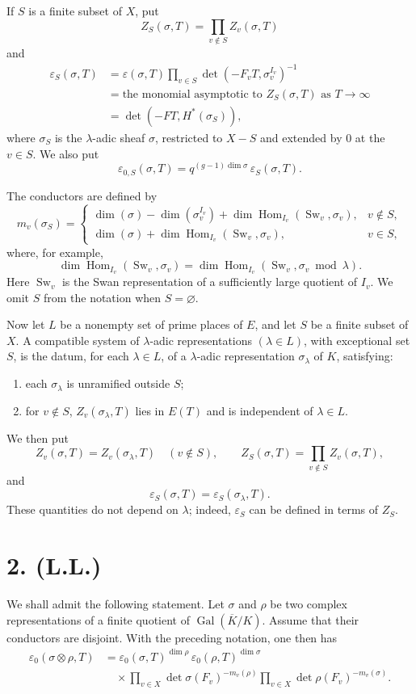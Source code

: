 \documentclass[11pt]{article}
\newcommand{\Gal}{\operatorname{Gal}}
\newcommand{\Hom}{\operatorname{Hom}}
\newcommand{\Sw}{\operatorname{Sw}}
\newcommand{\eps}{\varepsilon}
\begin{document}
If \(S\) is a finite subset of \(X\), put
\[
Z_S(\sigma,T)=\prod_{v\notin S} Z_v(\sigma,T)
\]
and
\[
\begin{aligned}
\eps_S(\sigma,T)
&=\eps(\sigma,T)\prod_{v\in S}
\det(-F_vT,\sigma_v^{I_v})^{-1}  \\
&=\text{the monomial asymptotic to }Z_S(\sigma,T)\text{ as }T\to\infty \\
&=\det(-FT,H^\ast(\sigma_S)),
\end{aligned}
\]
where \(\sigma_S\) is the \(\lambda\)-adic sheaf \(\sigma\), restricted to \(X-S\) and extended by \(0\) at the \(v\in S\). We also put
\[
\eps_{0,S}(\sigma,T)=q^{(g-1)\dim\sigma}\,\eps_S(\sigma,T).
\]

The conductors are defined by
\[
m_v(\sigma_S)=
\begin{cases}
\dim(\sigma)-\dim(\sigma_v^{I_v})
+\dim\Hom_{I_v}(\Sw_v,\sigma_v), & v\notin S,\\[4pt]
\dim(\sigma)+\dim\Hom_{I_v}(\Sw_v,\sigma_v), & v\in S,
\end{cases}
\]
where, for example,
\[
\dim\Hom_{I_v}(\Sw_v,\sigma_v)
=
\dim\Hom_{I_v}(\Sw_v,\sigma_v \bmod \lambda).
\]
Here \(\Sw_v\) is the Swan representation of a sufficiently large quotient of \(I_v\). We omit \(S\) from the notation when \(S=\varnothing\).

Now let \(L\) be a nonempty set of prime places of \(E\), and let \(S\) be a finite subset of \(X\). A compatible system of \(\lambda\)-adic representations \((\lambda\in L)\), with exceptional set \(S\), is the datum, for each \(\lambda\in L\), of a \(\lambda\)-adic representation \(\sigma_\lambda\) of \(K\), satisfying:
\begin{enumerate}[label=(\roman*)]
\item each \(\sigma_\lambda\) is unramified outside \(S\);
\item for \(v\notin S\), \(Z_v(\sigma_\lambda,T)\) lies in \(E(T)\) and is independent of \(\lambda\in L\).
\end{enumerate}
We then put
\[
Z_v(\sigma,T)=Z_v(\sigma_\lambda,T)\quad(v\notin S),\qquad
Z_S(\sigma,T)=\prod_{v\notin S}Z_v(\sigma,T),
\]
and
\[
\eps_S(\sigma,T)=\eps_S(\sigma_\lambda,T).
\]
These quantities do not depend on \(\lambda\); indeed, \(\eps_S\) can be defined in terms of \(Z_S\).

\section*{2. (L.L.)}

We shall admit the following statement. Let \(\sigma\) and \(\rho\) be two complex representations of a finite quotient of \(\Gal(\overline K/K)\). Assume that their conductors are disjoint. With the preceding notation, one then has
\[
\tag{L.L.}
\begin{aligned}
\eps_0(\sigma\otimes\rho,T)
&=\eps_0(\sigma,T)^{\dim\rho}\,
  \eps_0(\rho,T)^{\dim\sigma}  \\
&\quad\times
\prod_{v\in X}\det\sigma(F_v)^{-m_v(\rho)}
\prod_{v\in X}\det\rho(F_v)^{-m_v(\sigma)} .
\end{aligned}
\]
\end{document}
